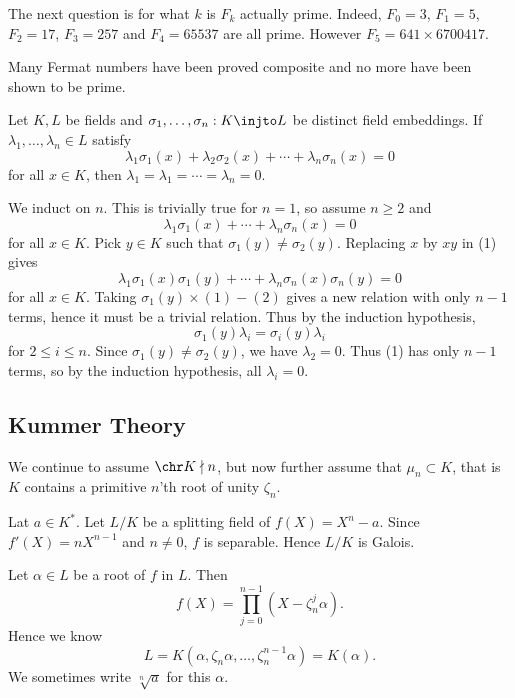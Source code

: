 \documentclass[12pt]{article}
\begin{document}
The next question is for what $k$ is $F_k$ actually prime. Indeed, $F_0 = 3$, $F_1 = 5$, $F_2 = 17$, $F_3 = 257$ and $F_4 = 65537$ are all prime. However $F_5 = 641 \times 6700417$.

Many Fermat numbers have been proved composite and no more have been shown to be prime.

\begin{theorem}
	Let $K, L$ be fields and $\sigma_1, \ldots, \sigma_n : K \injto L$ be distinct field embeddings. If $\lambda_1, \ldots, \lambda _n \in L$ satisfy
	\[
	\lambda_1 \sigma_1(x) + \lambda_2 \sigma_2(x) + \cdots + \lambda_n \sigma_n(x) = 0
	\]
	for all $x \in K$, then $\lambda_1 = \lambda_1 = \cdots = \lambda_n = 0$.
\end{theorem}

\begin{proofbox}
	We induct on $n$. This is trivially true for $n = 1$, so assume $n \geq 2$ and
	\[
		\lambda_1 \sigma_1(x) + \cdots + \lambda_n \sigma_n(x) = 0 \tag{1}
	\]
	for all $x \in K$. Pick $y \in K$ such that $\sigma_1(y) \neq \sigma_2(y)$. Replacing $x$ by $xy$ in (1) gives
	\[
		\lambda_1 \sigma_1(x) \sigma_1(y) + \cdots + \lambda_n \sigma_n(x) \sigma_n(y) = 0 \tag{2}
	\]
	for all $x \in K$. Taking $\sigma_1(y) \times (1) - (2)$ gives a new relation with only $n-1$ terms, hence it must be a trivial relation. Thus by the induction hypothesis,
	\[
	\sigma_1(y) \lambda_i = \sigma_i(y) \lambda_i
	\]
	for $2 \leq i \leq n$. Since  $\sigma_1(y) \neq \sigma_2(y)$, we have $\lambda_2 = 0$. Thus (1) has only $n-1$ terms, so by the induction hypothesis, all $\lambda_i = 0$.
\end{proofbox}

\subsection{Kummer Theory}
\label{sub:kum_thm}

We continue to assume $\chr K \nmid n$, but now further assume that $\mu_n \subset K$, that is $K$ contains a primitive $n$'th root of unity $\zeta_n$.

Lat $a \in K^{\ast}$. Let $L/K$ be a splitting field of $f(X) = X^n - a$. Since $f'(X) = n X^{n-1}$ and $n \neq 0$, $f$ is separable. Hence $L/K$ is Galois.

Let $\alpha \in L$ be a root of $f$ in $L$. Then
\[
f(X) = \prod_{j = 0}^{n-1}(X - \zeta_n^j \alpha).
\]
Hence we know
\[
L = K(\alpha, \zeta_n \alpha, \ldots, \zeta_n^{n-1}\alpha) = K(\alpha).
\]
We sometimes write $\sqrt[n]a$ for this $\alpha$.
\end{document}
